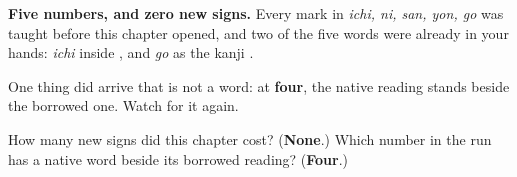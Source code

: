 \begin{grammarlens}[title={What you've built this chapter, in one number}]
\textbf{Five numbers, and zero new signs.} Every mark in \emph{ichi, ni, san, yon, go} was taught before this chapter opened, and two of the five words were already in your hands: \emph{ichi} inside \textbf{}, and \emph{go} as the kanji \textbf{}.

One thing did arrive that is not a word: at \textbf{four}, the native reading stands beside the borrowed one. Watch for it again.
\end{grammarlens}

\begin{tcolorbox}[breakable,colback=teal!4,colframe=teal!35!black,title={Before you move on}]
How many new signs did this chapter cost? (\textbf{None}.) Which number in the run has a native word beside its borrowed reading? (\textbf{Four}.)
\end{tcolorbox}
